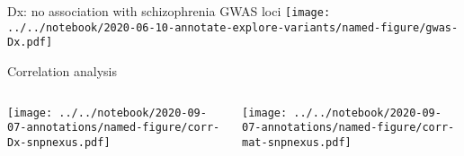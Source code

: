 \documentclass[usenames,dvipsnames]{beamer}
\begin{document}
\begin{frame}{Dx: no association with schizophrenia GWAS loci}
\texttt{[image: ../../notebook/2020-06-10-annotate-explore-variants/named-figure/gwas-Dx.pdf]}
\end{frame}


\begin{frame}{Correlation analysis}
\begin{columns}[t]
\begin{column}{0.4\textwidth}

\texttt{[image: ../../notebook/2020-09-07-annotations/named-figure/corr-Dx-snpnexus.pdf]}
\end{column}

\begin{column}{0.5\textwidth}

\texttt{[image: ../../notebook/2020-09-07-annotations/named-figure/corr-mat-snpnexus.pdf]}
\end{column}
\end{columns}
\end{frame}
\end{document}
